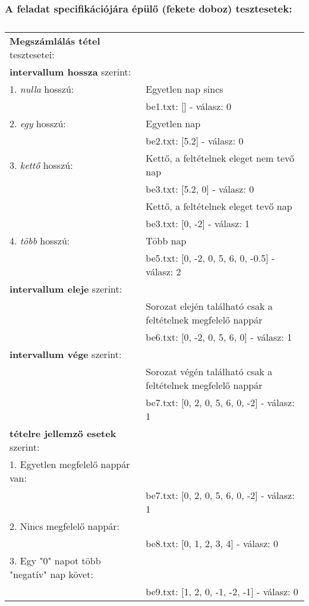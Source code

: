 \documentclass[a4paper]{article}
\begin{document}
      \subsubsection{A feladat specifikációjára épülő (fekete doboz) tesztesetek:}
      \begin{table}[H]
        \caption*{}
        \begin{tabular*}{\textwidth}{ll}
          \toprule
          \textbf{Megszámlálás tétel} tesztesetei: & \\
          \textbf{intervallum hossza} szerint: & \\
          1. \textit{nulla} hosszú: & Egyetlen nap sincs \\
          & \quad be1.txt: [] - válasz: 0 \\
          2. \textit{egy} hosszú: & Egyetlen nap \\
          & \quad be2.txt: [5.2] - válasz: 0 \\
          3. \textit{kettő} hosszú: & Kettő, a feltételnek eleget nem tevő nap \\
          & \quad be3.txt: [5.2, 0] - válasz: 0 \\
          & Kettő, a feltételnek eleget tevő nap \\
          & \quad be3.txt: [0, -2] - válasz: 1 \\
          4. \textit{több} hosszú: & Több nap \\
          & \quad be5.txt: [0, -2, 0, 5, 6, 0, -0.5] - válasz: 2 \\
          \textbf{intervallum eleje} szerint: & \\
          & Sorozat elején található csak a feltételnek megfelelő nappár \\
          & \quad be6.txt: [0, -2, 0, 5, 6, 0] - válasz: 1 \\
          \textbf{intervallum vége} szerint: & \\
          & Sorozat végén található csak a feltételnek megfelelő nappár \\
          & \quad be7.txt: [0, 2, 0, 5, 6, 0, -2] - válasz: 1 \\
          \textbf{tételre jellemző esetek} szerint: & \\
          1. Egyetlen megfelelő nappár van: & \\
          & \quad be7.txt: [0, 2, 0, 5, 6, 0, -2] - válasz: 1 \\
          2. Nincs megfelelő nappár: & \\
          & \quad be8.txt: [0, 1, 2, 3, 4] - válasz: 0 \\
          3. Egy "0" napot több "negatív" nap követ: & \\
          & \quad be9.txt: [1, 2, 0, -1, -2, -1] - válasz: 0 \\
          \bottomrule
        \end{tabular*}
      \end{table}
\end{document}
